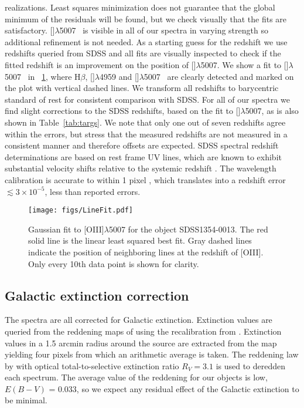 \documentclass{aa}    %
\newcommand{\figref}[1]{\ref{fig:#1}}
\newcommand{\Fig}[1]{\figurename~\figref{#1}}
\newcommand{\figlabel}[1]{\label{fig:#1}}
\newcommand{\Tab}[1]{Table~\ref{tab:#1}}
\newcommand{\tab}[1]{\Tab{#1}}
\newcommand{\sectlabel}[1]{\label{sect:#1}}
\newcommand{\hb}{H$\beta$}
\newcommand{\oiii}{[\ion{O}{iii}]$\lambda$5007}
\begin{document}
realizations. Least squares minimization does not guarantee that the global minimum of the
 residuals will be found, but we check
visually that the fits are satisfactory. \oiii~ is visible in all of
our spectra in varying strength so additional refinement is not
needed. As a starting guess for the redshift we use redshifts queried
from SDSS and all fits are visually inspected to check if the fitted
redshift is an improvement on the position of \oiii. We show a fit to
\oiii~ in \Fig{linefit}, where \hb, []$\lambda$4959 and
\oiii~ are clearly detected and marked on the plot with vertical
dashed lines. We transform all redshifts to barycentric standard of rest for consistent
comparison with SDSS. For all of our spectra we find slight
corrections to the SDSS redshifts, based on the fit to \oiii, as is
also shown in \tab{targs}. We note that only one out of seven
redshifts agree within the errors, but stress that the measured
redshifts are not measured in a consistent manner and therefore
offsets are expected. SDSS spectral redshift determinations are based
on rest frame UV lines, which are known to exhibit substantial velocity
shifts relative to the systemic redshift \citep{Tytler1992,
  Hewett2010}. The wavelength calibration is accurate to within 1
pixel \citep{Kruhler2015}, which translates into a redshift error
$\lesssim 3\times 10^{-5}$, less than reported errors.

\begin{figure}[t!]
  \centering
  \texttt{[image: figs/LineFit.pdf]}
  \caption[]{Gaussian fit to [OIII]$\lambda$5007 for the object SDSS1354-0013. The red solid line is the
linear least squared best fit. Gray dashed lines indicate the
position of neighboring lines at the redshift of [OIII]. Only every 10th data point is shown for clarity.}
  \figlabel{linefit}
\end{figure}




\subsection{Galactic extinction correction} \sectlabel{extinct}

The spectra are all corrected for Galactic extinction. Extinction
values are queried from the reddening maps of \citet{Schlegel1998}
using the recalibration from \citet{Schlafly2011}. Extinction values
in a 1.5 arcmin radius around the source are extracted from the map yielding four pixels from which an arithmetic average is taken. The reddening law by
\citet{Fitzpatrick1999} with optical total-to-selective extinction
ratio $R_V = 3.1$ is used to deredden each spectrum. The average value
of the reddening for our objects is low, $E(B-V)$ = 0.033, so we
expect any residual effect of the Galactic extinction to be minimal.
\end{document}
